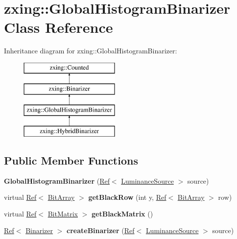 \hypertarget{classzxing_1_1_global_histogram_binarizer}{}\section{zxing\+:\+:Global\+Histogram\+Binarizer Class Reference}
\label{classzxing_1_1_global_histogram_binarizer}
Inheritance diagram for zxing\+:\+:Global\+Histogram\+Binarizer\+:\begin{figure}[H]
\begin{center}
\leavevmode
\includegraphics[height=4.000000cm]{classzxing_1_1_global_histogram_binarizer}
\end{center}
\end{figure}
\subsection*{Public Member Functions}
\begin{DoxyCompactItemize}
\item 
\mbox{\label{classzxing_1_1_global_histogram_binarizer_a8ecded04b58ac9f5c67e668b2a16d116}} 
{\bfseries Global\+Histogram\+Binarizer} (\mbox{\hyperlink{classzxing_1_1_ref}{Ref}}$<$ \mbox{\hyperlink{classzxing_1_1_luminance_source}{Luminance\+Source}} $>$ source)
\item 
\mbox{\label{classzxing_1_1_global_histogram_binarizer_a08e9f063a11bc84c465ce332cefee9c1}} 
virtual \mbox{\hyperlink{classzxing_1_1_ref}{Ref}}$<$ \mbox{\hyperlink{classzxing_1_1_bit_array}{Bit\+Array}} $>$ {\bfseries get\+Black\+Row} (int y, \mbox{\hyperlink{classzxing_1_1_ref}{Ref}}$<$ \mbox{\hyperlink{classzxing_1_1_bit_array}{Bit\+Array}} $>$ row)
\item 
\mbox{\label{classzxing_1_1_global_histogram_binarizer_abcd9a1bf0a0678ea231ba9a11da28534}} 
virtual \mbox{\hyperlink{classzxing_1_1_ref}{Ref}}$<$ \mbox{\hyperlink{classzxing_1_1_bit_matrix}{Bit\+Matrix}} $>$ {\bfseries get\+Black\+Matrix} ()
\item 
\mbox{\label{classzxing_1_1_global_histogram_binarizer_af3ef426f7b68d1488df18d6c6d73732e}} 
\mbox{\hyperlink{classzxing_1_1_ref}{Ref}}$<$ \mbox{\hyperlink{classzxing_1_1_binarizer}{Binarizer}} $>$ {\bfseries create\+Binarizer} (\mbox{\hyperlink{classzxing_1_1_ref}{Ref}}$<$ \mbox{\hyperlink{classzxing_1_1_luminance_source}{Luminance\+Source}} $>$ source)
\end{DoxyCompactItemize}
